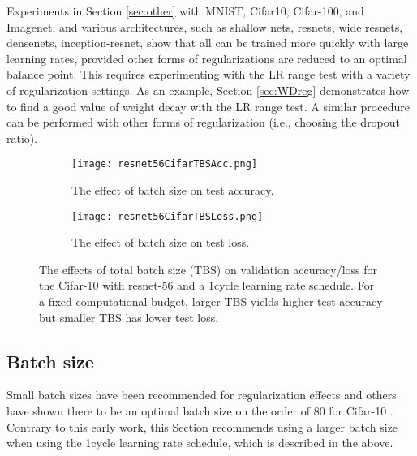 \documentclass{article} %
\begin{document}
Experiments in Section \ref*{sec:other} with MNIST, Cifar10, Cifar-100, and Imagenet, and various architectures, such as shallow nets,  resnets, wide resnets, densenets, inception-resnet, show that all can be trained more quickly with large learning rates, provided other forms of regularizations are reduced to an optimal balance point.  This requires experimenting with the LR range test with a variety of regularization settings.  As an example, Section \ref*{sec:WDreg} demonstrates how to find a good value of weight decay with the LR range test.  A similar procedure can be performed with other forms of regularization (i.e., choosing the dropout ratio).

\begin{figure}[tbh]
	\centering
	\begin{subfigure}[b]{0.42\textwidth}
		\texttt{[image: resnet56CifarTBSAcc.png]}
		\caption{The effect of batch size on test accuracy.}
		\label{fig:resnet56CifarTBSAcc}       %
	\end{subfigure}
	\centering
	\begin{subfigure}[b]{0.5\textwidth}
		\texttt{[image: resnet56CifarTBSLoss.png]}
		\caption{The effect of batch size on test loss.}
		\label{fig:resnet56CifarTBSLoss}       %
	\end{subfigure}
	\caption{The effects of total batch size (TBS) on validation accuracy/loss for the Cifar-10  with resnet-56 and a 1cycle learning rate schedule.  For a fixed computational budget, larger TBS yields higher test accuracy but smaller TBS has lower test loss.}
	\label{fig:batchsize}
	\vspace{-15pt}	
\end{figure}


\subsection{Batch size}
\label{sec:TBS}

Small batch sizes have been recommended for regularization effects \citep{wilson2003general} and others have shown there to be an optimal batch size on the order of 80 for Cifar-10 \citep{smith2017understanding}. Contrary to this early work, this Section recommends using a larger batch size when using the 1cycle learning rate schedule, which is described in the above.
\end{document}
